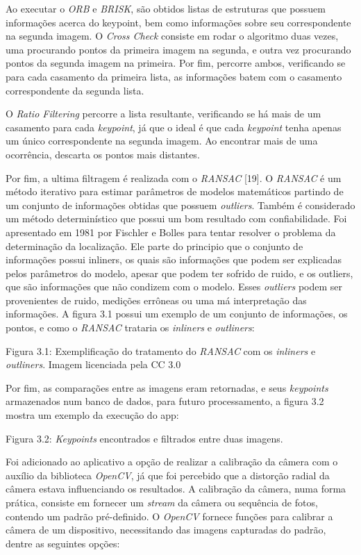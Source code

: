Ao executar o \textit{ORB} e \textit{BRISK}, são obtidos listas de estruturas que possuem informações acerca do keypoint, bem como informações sobre seu correspondente na segunda imagem. O \textit{Cross Check} consiste em rodar o algoritmo duas vezes, uma procurando pontos da primeira imagem na segunda, e outra vez procurando pontos da segunda imagem na primeira. Por fim, percorre ambos, verificando se para cada casamento da primeira lista, as informações batem com o casamento correspondente da segunda lista.

O \textit{Ratio Filtering} percorre a lista resultante, verificando se há mais de um casamento para cada \textit{keypoint}, já que o ideal é que cada \textit{keypoint} tenha apenas um único correspondente na segunda imagem. Ao encontrar mais de uma ocorrência, descarta os pontos mais distantes.

Por fim, a ultima filtragem é realizada com o \textit{RANSAC} [19]. O \textit{RANSAC} é um método iterativo para estimar parâmetros de modelos matemáticos partindo de um conjunto de informações obtidas que possuem \textit{outliers}. Também é considerado um método determinístico que possui um bom resultado com confiabilidade. Foi apresentado em 1981 por Fischler e Bolles para tentar resolver o problema da determinação da localização. Ele parte do principio que o conjunto de informações possui inliners, os quais são informações que podem ser explicadas pelos parâmetros do modelo, apesar que podem ter sofrido de ruido, e os outliers, que são informações que não condizem com o modelo. Esses \textit{outliers} podem ser provenientes de ruido, medições errôneas ou uma má interpretação das informações. A figura 3.1 possui um exemplo de um conjunto de informações, os pontos, e como o \textit{RANSAC} trataria os \textit{inliners} e \textit{outliners}:
  
Figura 3.1: Exemplificação do tratamento do \textit{RANSAC} com os \textit{inliners} e \textit{outliners}. Imagem licenciada pela CC 3.0

Por fim, as comparações entre as imagens eram retornadas, e seus \textit{keypoints} armazenados num banco de dados, para futuro processamento, a figura 3.2 mostra um exemplo da execução do app:


Figura 3.2: \textit{Keypoints} encontrados e filtrados entre duas imagens.
 
Foi adicionado ao aplicativo a opção de realizar a calibração da câmera com o auxílio da biblioteca \textit{OpenCV}, já que foi percebido que a distorção radial da câmera estava influenciando os resultados. A calibração da câmera, numa forma prática, consiste em fornecer um \textit{stream} da câmera ou sequência de fotos, contendo um padrão pré-definido. O \textit{OpenCV} fornece funções para calibrar a câmera de um dispositivo, necessitando das imagens capturadas do padrão, dentre as seguintes opções:

